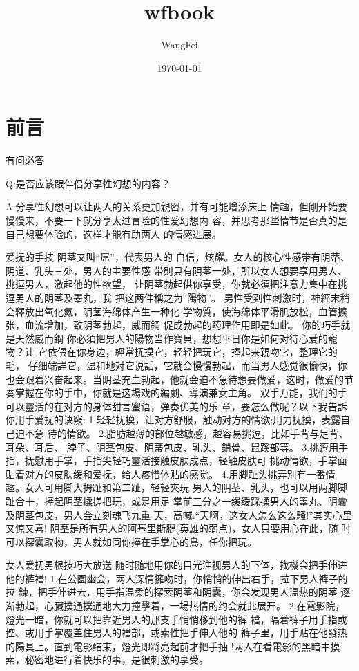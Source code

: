 \documentclass[12pt,UTF8]{ctexbook}
\title{\heiti\zihao{0} wfbook}
\author{WangFei}
\date{\today}
\begin{document}
\maketitle
\tableofcontents

\frontmatter

\chapter{前言}

有问必答

Q:是否应该跟伴侣分享性幻想的内容？

A:分享性幻想可以让两人的关系更加親密，并有可能增添床上
情趣，但剛开始要慢慢来，不要一下就分享太过冒险的性爱幻想内
容，并思考那些情节是否真的是自己想要体验的，这样才能有助两人
的情感进展。

爱抚的手技
阴茎又叫“屌”，代表男人的
自信，炫耀。女人的核心性感带有阴蒂、阴道、乳头三处，男人的主要性感
带則只有阴茎一处，所以女人想要享用男人、挑逗男人，激起他的性欲望，
让阴茎勃起供你享受，你就必須把注意力集中在挑逗男人的阴茎及睪丸，我
把这两件稱之为“陽物”。
男性受到性刺激时，神經末稍会釋放出氧化氮，阴茎海绵体产生一种化
学物質，使海绵体平滑肌放松，血管擴张，血流增加，致阴茎勃起，威而鋼
促成勃起的药理作用即是如此。
你的巧手就是天然威而鋼
你必須把男人的陽物当作寶貝，想想平日你是如何对待心爱的寵物？让
它依偎在你身边，經常抚摸它，轻轻把玩它，捧起来親吻它，整理它的毛，
仔细端詳它，温和地对它说話，它就会慢慢勃起，而当男人感觉很愉快，你
也会跟着兴奋起来。当阴茎充血勃起，他就会迫不急待想要做爱，这时，做爱的节奏掌握在你的手中，你就是这場戏的編劇、導演兼女主角。
双手万能，我们的手可以靈活的在对方的身体甜言蜜语，弹奏优美的乐
章，要怎么做呢？以下我告訴你用手爱抚的诀竅:
1.轻轻抚摸，让对方舒服，触动对方的情欲;用力抚摸，表露自己迫不急
待的情欲。
2.脂肪越薄的部位越敏感，越容易挑逗，比如手背与足背、耳朵、耳后、
脖子、阴茎包皮、阴蒂包皮、乳头、鎖骨、鼠蹊部等。
3.挑逗用手指，抚慰用手掌，手指尖轻巧靈活接触皮肤成点，轻触皮肤可
挑动情欲，手掌面贴着对方的皮肤缓和爱抚，给人疼惜体贴的感觉。
4.用脚趾头挑弄别有一番情趣。女人可用脚大拇趾和第二趾，轻轻夾玩
男人的阴茎、乳头，也可以用两脚脚趾合十，捧起阴茎揉搓把玩，或是用足
掌前三分之一缓缓踩揉男人的睾丸、阴囊及阴茎包皮，男人会立刻魂飞九重
天，高喊:“天啊，这女人怎么这么騷!”其实心里又惊又喜!
阴茎是所有男人的阿基里斯腱(英雄的弱点)，女人只要用心在此，随
时可以探囊取物，男人就如同你捧在手掌心的鳥，任你把玩。

女人爱抚男根技巧大放送
随时随地用你的目光注视男人的下体，找機会把手伸进他的裤襠!
1.在公園幽会，两人深情擁吻时，你悄悄的伸出右手，拉下男人裤子的拉
鍊，把手伸进去，用手指温柔的探索阴茎和阴囊，你会发现男人温热的阴茎
逐渐勃起，心臟撲通撲通地大力撞擊着，一場热情的约会就此展开。
2.在電影院，燈光一暗，你就可以把靠近男人的那支手悄悄移到他的裤
襠，隔着裤子用手指或控、或用手掌覆盖住男人的襠部，或索性把手伸入他的
裤子里，用手贴在他發热的陽具上。直到電影结束，燈光即将亮起前才把手抽
!两人在看電影的黑暗中摸索，秘密地进行着快乐的事，是很刺激的享受。
\end{document}
